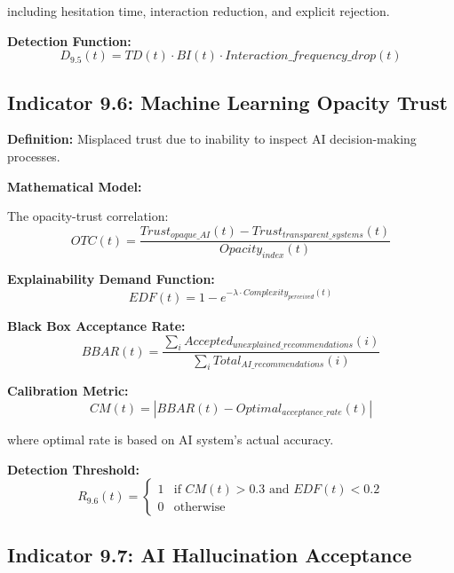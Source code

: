 \documentclass[11pt,a4paper]{article}
\begin{document}
including hesitation time, interaction reduction, and explicit rejection.

\textbf{Detection Function:}
\begin{equation}
D_{9.5}(t) = TD(t) \cdot BI(t) \cdot Interaction\_frequency\_drop(t)
\end{equation}

\subsection{Indicator 9.6: Machine Learning Opacity Trust}

\textbf{Definition:} Misplaced trust due to inability to inspect AI decision-making processes.

\textbf{Mathematical Model:}

The opacity-trust correlation:
\begin{equation}
OTC(t) = \frac{Trust_{opaque\_AI}(t) - Trust_{transparent\_systems}(t)}{Opacity_{index}(t)}
\end{equation}

\textbf{Explainability Demand Function:}
\begin{equation}
EDF(t) = 1 - e^{-\lambda \cdot Complexity_{perceived}(t)}
\end{equation}

\textbf{Black Box Acceptance Rate:}
\begin{equation}
BBAR(t) = \frac{\sum_{i} Accepted_{unexplained\_recommendations}(i)}{\sum_{i} Total_{AI\_recommendations}(i)}
\end{equation}

\textbf{Calibration Metric:}
\begin{equation}
CM(t) = |BBAR(t) - Optimal_{acceptance\_rate}(t)|
\end{equation}

where optimal rate is based on AI system's actual accuracy.

\textbf{Detection Threshold:}
\begin{equation}
R_{9.6}(t) = \begin{cases}
1 & \text{if } CM(t) > 0.3 \text{ and } EDF(t) < 0.2 \\
0 & \text{otherwise}
\end{cases}
\end{equation}

\subsection{Indicator 9.7: AI Hallucination Acceptance}
\end{document}
